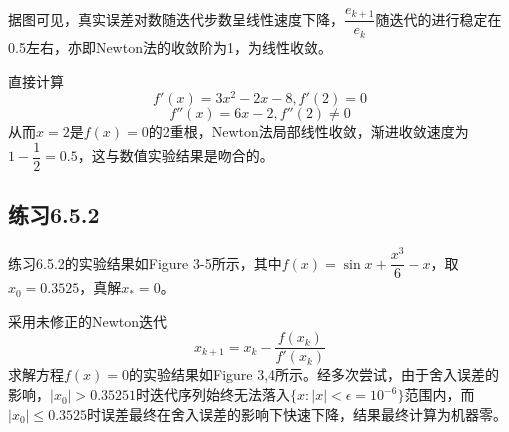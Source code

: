 \documentclass[UTF8,a4paper,10pt]{ctexart}
\begin{document}
        据图可见，真实误差对数随迭代步数呈线性速度下降，$\dfrac{e_{k+1}}{e_k}$随迭代的进行稳定在0.5左右，亦即Newton法的收敛阶为1，为线性收敛。
        \par
        直接计算
        $$
        f'(x)=3x^2-2x-8,f'(2)=0
        $$
        $$
        f''(x)=6x-2,f''(2)\neq 0
        $$
        从而$x=2$是$f(x)=0$的2重根，Newton法局部线性收敛，渐进收敛速度为$1-\dfrac{1}{2}=0.5$，这与数值实验结果是吻合的。

    \subsection{练习6.5.2}
        \par
        练习6.5.2的实验结果如Figure 3-5所示，其中$f(x)=\sin x+\dfrac{x^3}{6}-x$，取$x_0=0.3525$，真解$x_*=0$。
        \par
        采用未修正的Newton迭代
        $$
        x_{k+1}=x_k-\dfrac{f(x_k)}{f'(x_k)}
        $$
        求解方程$f(x)=0$的实验结果如Figure 3,4所示。经多次尝试，由于舍入误差的影响，$\left|x_0\right|>0.35251$时迭代序列始终无法落入$\{x:\left|x\right|<\epsilon=10^{-6}\}$范围内，而$\left|x_0\right|\le 0.3525$时误差最终在舍入误差的影响下快速下降，结果最终计算为机器零。
\end{document}
